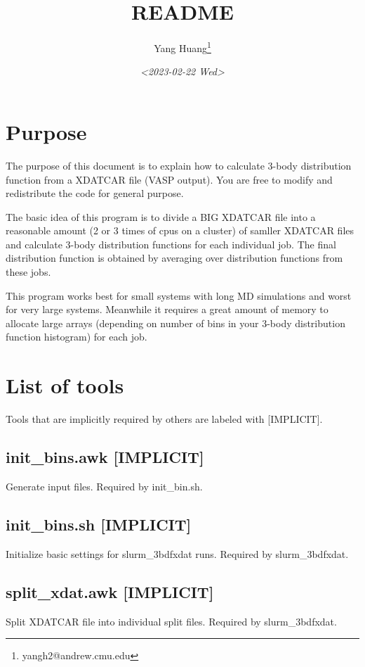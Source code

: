 \documentclass[11pt]{article}
\author{Yang Huang\thanks{yangh2@andrew.cmu.edu}}
\date{\textit{<2023-02-22 Wed>}}
\title{README}
\begin{document}
\maketitle
\tableofcontents


\section{Purpose}
\label{sec:orgbc14243}
The purpose of this document is to explain how to calculate 3-body distribution function
from a XDATCAR file (VASP output). You are free to modify and
redistribute the code for general purpose.

The basic idea of this program is to divide a BIG XDATCAR file into a
reasonable amount (2 or 3 times of cpus on a cluster) of samller
XDATCAR files and calculate 3-body distribution functions for each
individual job. The final distribution function is obtained by averaging
over distribution functions from these jobs.

This program works best for small systems with long MD
simulations and worst for very large systems. Meanwhile it requires a
great amount of memory to allocate large arrays (depending on number
of bins in your 3-body distribution function histogram) for each job. 

\section{List of tools}
\label{sec:org60e9ebb}
Tools that are implicitly required by others are labeled with [IMPLICIT].

\subsection{init\_bins.awk [IMPLICIT]}
\label{sec:org554ce06}
Generate input files. Required by init\_bin.sh.

\subsection{init\_bins.sh [IMPLICIT]}
\label{sec:org365d0fc}
Initialize basic settings for slurm\_3bdfxdat runs. Required by slurm\_3bdfxdat.

\subsection{split\_xdat.awk [IMPLICIT]}
\label{sec:org4a15537}
Split XDATCAR file into individual split files. Required by slurm\_3bdfxdat.
\end{document}
